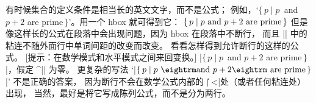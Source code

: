 \dangerexercise 有时候集合的定义条件是相当长的英文文字，而不是公式；
例如，`$\{\,p\mid p$~and $p+2$ are prime$\,\}$'。用一个 hbox 就可得到它：
\begintt
$\{\,p\mid\hbox{$p$ and $p+2$ are prime}\,\}$
\endtt
但是像这样长的公式在段落中会出现问题，因为 hbox 在段落中不断行，
而且 |\hbox| 中的粘连不随外面行中单词间距的改变而改变。
看看怎样得到允许断行的这样的公式。%
[{提示}：在数学模式和水平模式之间来回变换。]
\answer |$\{\,p\mid p$~and $p+2$ are prime$\,\}$|，假定 ^|\mathsurround| 为零。
更复杂的写法
`|$\{\,p\mid p\ {\rm and}\ p+2\rm\ are\ prime\,\}$|' 不是正确的答案，
因为断行不会在数学公式内部的 |\|\] ^^|\space|处（或者任何粘连处）出现，
当然，最好是将它写成陈列公式，而不是分为两行。

